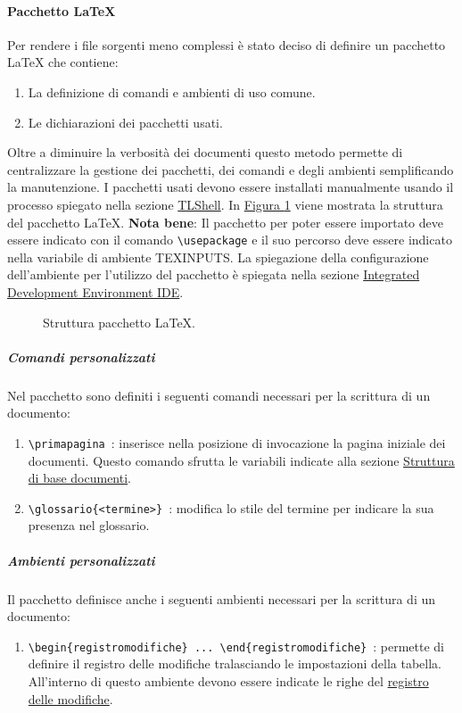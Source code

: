 \paragraph{Pacchetto LaTeX}
Per rendere i file sorgenti meno complessi è stato deciso di definire un pacchetto LaTeX che contiene:
\begin{enumerate}
    \item La definizione di comandi e ambienti di uso comune.
    \item Le dichiarazioni dei pacchetti usati.
\end{enumerate}
Oltre a diminuire la verbosità dei documenti questo metodo permette di centralizzare la gestione dei pacchetti, dei comandi e degli ambienti semplificando la manutenzione.
I pacchetti usati devono essere installati manualmente usando il processo spiegato nella sezione \hyperref[subpar:TLShell]{TLShell}.
In \hyperref[fig:pacchetto_latex]{Figura \ref{fig:pacchetto_latex}} viene mostrata la struttura del pacchetto LaTeX.
\textbf{Nota bene}: Il pacchetto per poter essere importato deve essere indicato con il comando \lstinline|\usepackage| e il suo percorso deve essere indicato nella variabile di ambiente TEXINPUTS.
La spiegazione della configurazione dell'ambiente per l'utilizzo del pacchetto è spiegata nella sezione \hyperref[par:IDE]{Integrated Development Environment IDE}.
\begin{figure}[H]
    \caption{Struttura pacchetto LaTeX.}
    \label{fig:pacchetto_latex}
\end{figure}

\subparagraph{Comandi personalizzati}
Nel pacchetto sono definiti i seguenti comandi necessari per la scrittura di un documento:
\begin{enumerate}
    \item \lstinline|\primapagina|\ : inserisce nella posizione di invocazione la pagina iniziale dei documenti.
    Questo comando sfrutta le variabili indicate alla sezione \hyperref[par:struttura_di_base_documenti]{Struttura di base documenti}.
    \item \lstinline|\glossario{<termine>}|\ : modifica lo stile del termine per indicare la sua presenza nel glossario.
    
\end{enumerate}

\subparagraph{Ambienti personalizzati}
Il pacchetto definisce anche i seguenti ambienti necessari per la scrittura di un documento:
\begin{enumerate}
    \item \lstinline|\begin{registromodifiche} ... \end{registromodifiche}|\ :
    permette di definire il registro delle modifiche tralasciando le impostazioni della tabella.
    All'interno di questo ambiente devono essere indicate le righe del \hyperref[par:registro_delle_modifiche]{registro delle modifiche}.
\end{enumerate}

